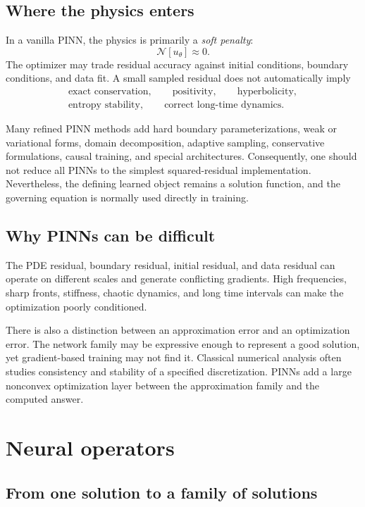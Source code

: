 \documentclass[11pt]{article}
\newcommand{\N}{\mathcal{N}}
\begin{document}
\subsection{Where the physics enters}

In a vanilla PINN, the physics is primarily a \emph{soft penalty}:
\[
 \N[u_\theta]\approx0.
\]
The optimizer may trade residual accuracy against initial conditions, boundary conditions, and data fit. A small sampled residual does not automatically imply
\[
\begin{gathered}
\text{exact conservation},\qquad
\text{positivity},\qquad
\text{hyperbolicity},\\
\text{entropy stability},\qquad
\text{correct long-time dynamics}.
\end{gathered}
\]

Many refined PINN methods add hard boundary parameterizations, weak or variational forms, domain decomposition, adaptive sampling, conservative formulations, causal training, and special architectures. Consequently, one should not reduce all PINNs to the simplest squared-residual implementation. Nevertheless, the defining learned object remains a solution function, and the governing equation is normally used directly in training.

\subsection{Why PINNs can be difficult}

The PDE residual, boundary residual, initial residual, and data residual can operate on different scales and generate conflicting gradients. High frequencies, sharp fronts, stiffness, chaotic dynamics, and long time intervals can make the optimization poorly conditioned.

There is also a distinction between an approximation error and an optimization error. The network family may be expressive enough to represent a good solution, yet gradient-based training may not find it. Classical numerical analysis often studies consistency and stability of a specified discretization. PINNs add a large nonconvex optimization layer between the approximation family and the computed answer.

\section{Neural operators}

\subsection{From one solution to a family of solutions}
\end{document}
